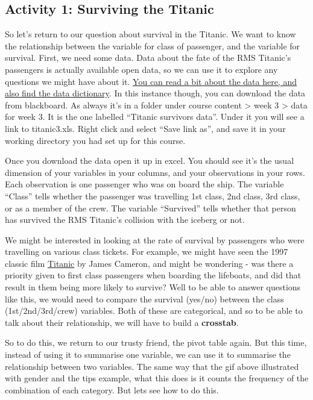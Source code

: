 \documentclass[]{book}
\theoremstyle{definition}
\theoremstyle{definition}
\theoremstyle{definition}
\theoremstyle{remark}
\begin{document}
\hypertarget{activity-1-surviving-the-titanic}{%
\subsection{Activity 1: Surviving the
Titanic}\label{activity-1-surviving-the-titanic}}

 So let's return to our question about survival in the Titanic. We want
to know the relationship between the variable for class of passenger,
and the variable for survival. First, we need some data. Data about the
fate of the RMS Titanic's passengers is actually available open data, so
we can use it to explore any questions we might have about it.
\href{http://www.public.iastate.edu/~hofmann/data/titanic.html}{You can
read a bit about the data here, and also find the data dictionary}. In
this instance though, you can download the data from blackboard. As
always it's in a folder under course content \textgreater{} week 3
\textgreater{} data for week 3. It is the one labelled ``Titanic
survivors data''. Under it you will see a link to titanic3.xls. Right
click and select ``Save link as'', and save it in your working directory
you had set up for this course.

Once you download the data open it up in excel. You should see it's the
usual dimension of your variables in your columns, and your observations
in your rows. Each observation is one passenger who was on board the
ship. The variable ``Class'' tells whether the passenger was travelling
1st class, 2nd class, 3rd class, or as a member of the crew. The
variable ``Survived'' tells whether that person has survived the RMS
Titanic's collision with the iceberg or not.

We might be interested in looking at the rate of survival by passengers
who were travelling on various class tickets. For example, we might have
seen the 1997 classic film
\href{http://www.imdb.com/title/tt0120338/}{Titanic} by James Cameron,
and might be wondering - was there a priority given to first class
passengers when boarding the lifeboats, and did that result in them
being more likely to survive? Well to be able to answer questions like
this, we would need to compare the survival (yes/no) between the class
(1st/2nd/3rd/crew) variables. Both of these are categorical, and so to
be able to talk about their relationship, we will have to build a
\textbf{crosstab}.

So to do this, we return to our trusty friend, the pivot table again.
But this time, instead of using it to summarise one variable, we can use
it to summarise the relationship between two variables. The same way
that the gif above illustrated with gender and the tips example, what
this does is it counts the frequency of the combination of each
category. But lets see how to do this.
\end{document}
